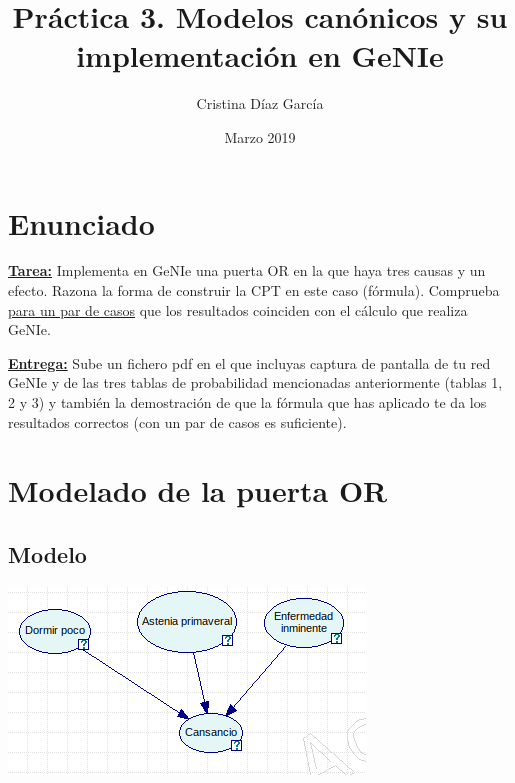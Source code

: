 \documentclass{article}
\title{Práctica 3. Modelos canónicos y su implementación en GeNIe}
\author{Cristina Díaz García}
\date{Marzo 2019}
\begin{document}

\begin{titlingpage}
\maketitle
\end{titlingpage}

\newpage

\tableofcontents

\newpage

\section{Enunciado}

\textbf{\underline{Tarea:}} Implementa en GeNIe una puerta OR en la que haya tres causas y un efecto. Razona la forma de construir la CPT en este caso (fórmula). Comprueba \underline{para un par de casos} que los resultados coinciden con el cálculo que realiza GeNIe.

\textbf{\underline{Entrega:}} Sube un fichero pdf en el que incluyas captura de pantalla de tu red GeNIe y de las tres tablas de probabilidad mencionadas anteriormente (tablas 1, 2 y 3) y también la demostración de que la fórmula que has aplicado te da los resultados correctos (con un par de casos es suficiente).

\section{Modelado de la puerta OR}

\subsection{\textbf{Modelo}}

\begin{center}
\includegraphics[scale=0.5]{modelo.png}
\end{center}
\end{document}
